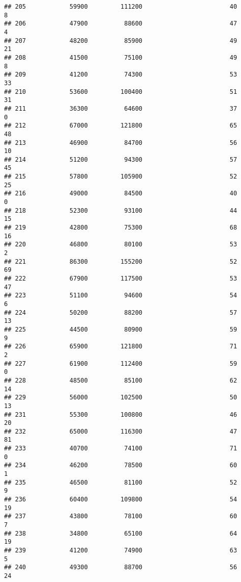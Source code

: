 \documentclass[
]{article}
\begin{document}
\begin{verbatim}
## 205            59900         111200                        40            8
## 206            47900          88600                        47            4
## 207            48200          85900                        49           21
## 208            41500          75100                        49            8
## 209            41200          74300                        53           33
## 210            53600         100400                        51           31
## 211            36300          64600                        37            0
## 212            67000         121800                        65           48
## 213            46900          84700                        56           10
## 214            51200          94300                        57           45
## 215            57800         105900                        52           25
## 216            49000          84500                        40            0
## 218            52300          93100                        44           15
## 219            42800          75300                        68           16
## 220            46800          80100                        53            2
## 221            86300         155200                        52           69
## 222            67900         117500                        53           47
## 223            51100          94600                        54            6
## 224            50200          88200                        57           13
## 225            44500          80900                        59            9
## 226            65900         121800                        71            2
## 227            61900         112400                        59            0
## 228            48500          85100                        62           14
## 229            56000         102500                        50           13
## 231            55300         100800                        46           20
## 232            65000         116300                        47           81
## 233            40700          74100                        71            0
## 234            46200          78500                        60            1
## 235            46500          81100                        52            9
## 236            60400         109800                        54           19
## 237            43800          78100                        60            7
## 238            34800          65100                        64           19
## 239            41200          74900                        63            5
## 240            49300          88700                        56           24

\end{verbatim}
\end{document}

